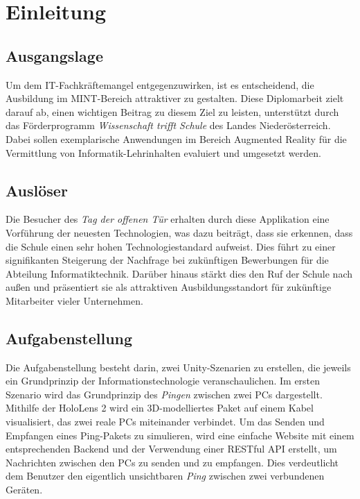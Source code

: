 \chapter{Einleitung}
\label{cha:Einleitung}

\section{Ausgangslage}
Um dem IT-Fachkräftemangel entgegenzuwirken, ist es entscheidend, die Ausbildung im MINT-Bereich attraktiver zu gestalten.
Diese Diplomarbeit zielt darauf ab, einen wichtigen Beitrag zu diesem Ziel zu leisten, unterstützt durch das Förderprogramm
\textit{Wissenschaft trifft Schule} des Landes Niederösterreich. Dabei sollen exemplarische Anwendungen im Bereich Augmented
Reality für die Vermittlung von Informatik-Lehrinhalten evaluiert und umgesetzt werden.

\section{Auslöser}
Die Besucher des \textit{Tag der offenen Tür} erhalten durch diese Applikation eine Vorführung der neuesten Technologien,
was dazu beiträgt, dass sie erkennen, dass die Schule einen sehr hohen Technologiestandard aufweist. Dies führt zu einer
signifikanten Steigerung der Nachfrage bei zukünftigen Bewerbungen für die Abteilung Informatiktechnik. Darüber hinaus
stärkt dies den Ruf der Schule nach außen und präsentiert sie als attraktiven Ausbildungsstandort für zukünftige Mitarbeiter
vieler Unternehmen.

\section{Aufgabenstellung}
Die Aufgabenstellung besteht darin, zwei Unity-Szenarien zu erstellen, die jeweils ein Grundprinzip der Informationstechnologie
veranschaulichen. Im ersten Szenario wird das Grundprinzip des \textit{Pingen} zwischen zwei PCs dargestellt. Mithilfe
der HoloLens 2 wird ein 3D-modelliertes Paket auf einem Kabel visualisiert, das zwei reale PCs miteinander verbindet. Um
das Senden und Empfangen eines Ping-Pakets zu simulieren, wird eine einfache Website mit einem entsprechenden Backend und
der Verwendung einer RESTful API erstellt, um Nachrichten zwischen den PCs zu senden und zu empfangen. Dies verdeutlicht
dem Benutzer den eigentlich unsichtbaren \textit{Ping} zwischen zwei verbundenen Geräten.

